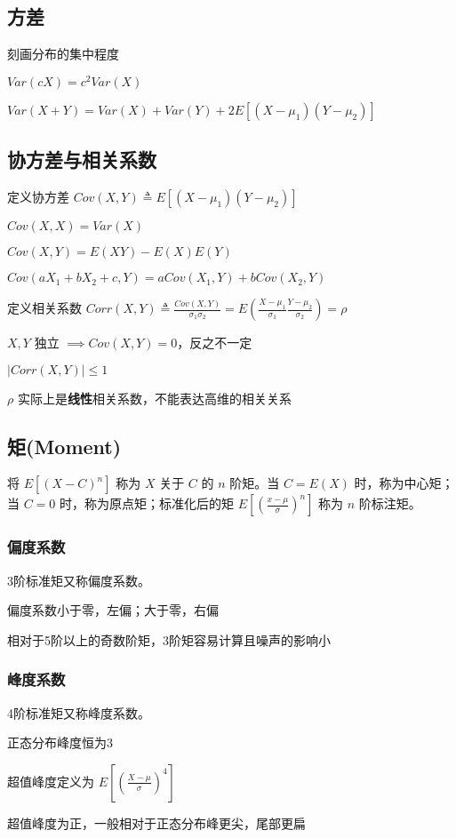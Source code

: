 \documentclass[./main.tex]{subfiles}
\begin{document}
\subsection{方差}
\begin{enumerate*}
    \item 刻画分布的集中程度
    \item $Var(cX)=c^2Var(X)$
    \item $Var(X+Y)=Var(X)+Var(Y)+2E[(X-\mu_1)(Y-\mu_2)]$
\end{enumerate*}
\subsection{协方差与相关系数}
\noindent 定义协方差 $Cov(X,Y)\triangleq E[(X-\mu_1)(Y-\mu_2)]$
\begin{enumerate*}
    \item $Cov(X,X)=Var(X)$
    \item $Cov(X,Y)=E(XY)-E(X)E(Y)$
    \item $Cov(aX_1+bX_2+c,Y)=aCov(X_1,Y)+bCov(X_2,Y)$
\end{enumerate*}
定义相关系数 $Corr(X,Y)\triangleq \frac{Cov(X,Y)}{\sigma_1\sigma_2}=E(\frac{X-\mu_1}{\sigma_1}\frac{Y-\mu_2}{\sigma_2})=\rho$
\begin{enumerate*}
    \item $X,Y$ 独立 $\implies Cov(X,Y)=0$，反之不一定
    \item $|Corr(X,Y)|\le 1$
    \item $\rho$ 实际上是\textbf{线性}相关系数，不能表达高维的相关关系
\end{enumerate*}
\subsection{矩(Moment)}
将 $E[(X-C)^n]$ 称为 $X$ 关于 $C$ 的 $n$ 阶矩。当 $C=E(X)$ 时，称为中心矩；当 $C=0$ 时，称为原点矩；标准化后的矩 $E[\left(\frac{x-\mu}{\sigma}\right)^n]$ 称为 $n$ 阶标注矩。
\subsubsection{偏度系数}
3阶标准矩又称偏度系数。
\begin{enumerate*}
    \item 偏度系数小于零，左偏；大于零，右偏
    \item 相对于5阶以上的奇数阶矩，3阶矩容易计算且噪声的影响小
\end{enumerate*}
\subsubsection{峰度系数}
4阶标准矩又称峰度系数。
\begin{enumerate*}
    \item 正态分布峰度恒为3
    \item 超值峰度定义为 $E[\left(\frac{X-\mu}{\sigma}\right)^4]$
    \item 超值峰度为正，一般相对于正态分布峰更尖，尾部更扁
\end{enumerate*}
\end{document}
